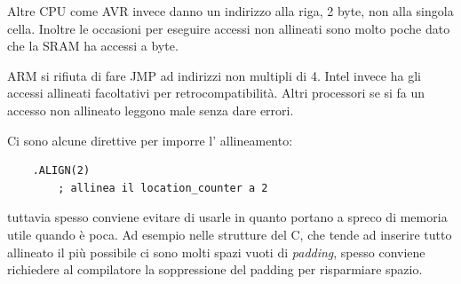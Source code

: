 Altre CPU come AVR invece danno un indirizzo alla riga, 2 byte, non alla singola cella.
Inoltre le occasioni per eseguire accessi non allineati sono molto poche dato che la SRAM ha accessi a byte.

ARM si rifiuta di fare JMP ad indirizzi non multipli di 4.
Intel invece ha gli accessi allineati facoltativi per retrocompatibilità.
Altri processori se si fa un accesso non allineato leggono male senza dare errori.

Ci sono alcune direttive per imporre l' allineamento:
\begin{verbatim}
    .ALIGN(2)
        ; allinea il location_counter a 2
\end{verbatim}
tuttavia spesso conviene evitare di usarle in quanto portano a spreco di memoria utile quando è poca.
Ad esempio nelle strutture del C, che tende ad inserire tutto allineato il più possibile ci sono molti spazi vuoti di \emph{padding}, spesso conviene richiedere al compilatore la soppressione del padding per risparmiare spazio.

